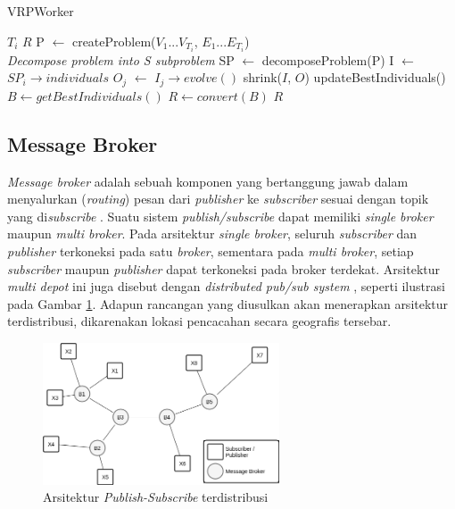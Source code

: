 \documentclass[conference]{IEEEtran}
\begin{document}
\begin{algorithm}[h]
	\caption{VRPWorker}
	\begin{algorithmic}[1]
		\renewcommand{\algorithmicrequire}{\textbf{Input:}}
		\renewcommand{\algorithmicensure}{\textbf{Output:}}
		\REQUIRE $T_i$
		\ENSURE  $R$
		\STATE P $\leftarrow$ createProblem($V_1...V_{T_i}$, $E_1...E_{T_i}$)
		\\ \textit{Decompose problem into S subproblem}
		\STATE SP $\leftarrow$ decomposeProblem(P)
				\STATE I $\leftarrow$ $SP_i \rightarrow individuals$
					\STATE $O_j$ $\leftarrow$ $I_j \rightarrow evolve()$
				\ENDFOR
				\STATE shrink($I$, $O$)
			\ENDFOR
			\STATE updateBestIndividuals()
		\ENDWHILE
		\STATE $B \leftarrow getBestIndividuals()$ 
		\STATE $R \leftarrow convert(B)$ 
		\RETURN $R$
	\end{algorithmic}
\end{algorithm}


\subsection{Message Broker}
\label{ssec:message-broker}
\textit{Message broker} adalah sebuah komponen yang bertanggung jawab dalam menyalurkan (\textit{routing}) pesan dari \textit{publisher} ke \textit{subscriber} sesuai dengan topik yang di\textit{subscribe} \cite{banavar_efficient_1999}. Suatu sistem \textit{publish/subscribe} dapat memiliki \textit{single broker} maupun \textit{multi broker}. Pada arsitektur \textit{single broker}, seluruh \textit{subscriber} dan \textit{publisher} terkoneksi pada satu \textit{broker}, sementara pada \textit{multi broker}, setiap \textit{subscriber} maupun \textit{publisher} dapat terkoneksi pada broker terdekat. Arsitektur \textit{multi depot} ini juga disebut dengan \textit{distributed pub/sub system} \cite{muhl_large-scale_2002}, seperti ilustrasi pada Gambar \ref{fig:pub_sub_distributed_ilustration}. Adapun rancangan yang diusulkan akan menerapkan arsitektur terdistribusi, dikarenakan lokasi pencacahan secara geografis tersebar.


\begin{figure}[h]
	\centering
	\includegraphics[width=7cm]{Resources/Images/pub_sub_distributed_ilustration}
	\caption{Arsitektur \textit{Publish-Subscribe} terdistribusi}
	\label{fig:pub_sub_distributed_ilustration}
\end{figure}
\end{document}
